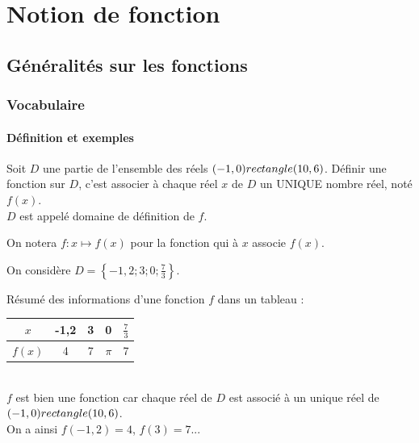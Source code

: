 


\chapter{Notion de fonction}

\section{Généralités sur les fonctions}

\subsection{Vocabulaire}

\subsubsection{Définition et exemples}

\begin{Définition} 
Soit $D$ une partie de l'ensemble des réels $(-1,0) rectangle (10,6)$. Définir une fonction sur $D$, c'est associer à chaque réel $x$ de $D$ un UNIQUE nombre réel, noté $f(x)$. \\
$D$ est appelé domaine de définition de $f$.
\end{Définition}

\begin{Notation}
On notera $f : x \mapsto f(x)$ pour la fonction qui à $x$ associe $f(x)$.
\end{Notation}

\begin{Exemple} 
\begin{minipage}[c]{0.7\textwidth}


On considère $D = \left\lbrace  -1,2; 3; 0; \frac{7}{3} \right\rbrace$.

Résumé des informations d'une fonction $f$ dans un tableau :
\end{minipage} \hfill \begin{minipage}[c]{0.3\textwidth}
\begin{center}
\begin{tabular}{|c|c|c|c|c|}
\hline
$x$ & -1,2 & 3 & 0 & $\frac{7}{3}$ \\
\hline
$f(x)$ & 4 & 7 & $\pi$ & 7 \\
\hline
\end{tabular}
\end{center}
\end{minipage} \\

$f$ est bien une fonction car chaque réel de $D$ est associé à un unique réel de $(-1,0) rectangle (10,6)$. \\
On a ainsi $f(-1,2) = 4$, $f(3) = 7$...
\end{Exemple}

